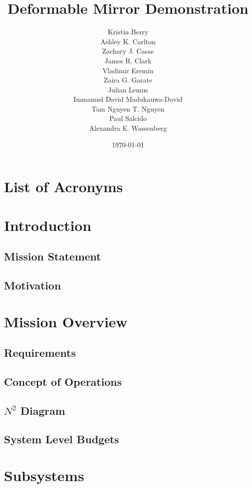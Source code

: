 \documentclass[12pt]{article}
\title{Deformable Mirror Demonstration}
\author{Kristin Berry\\
Ashley K. Carlton\\
Zachary J. Casas\\
James R. Clark\\
Vladimir Eremin\\ 
Zaira G. Garate\\ 
Julian Lemus\\
Immanuel David Madukauwa-David\\
Tam Nguyen T. Nguyen\\
Paul Salcido\\
Alexandra E. Wassenberg 
}
\date{\today}
\begin{document}
\maketitle
\newpage

\tableofcontents
\listoffigures
\listoftables


\section*{List of Acronyms}
\begin{acronym}


\end{acronym}
\newpage

\section{Introduction}
		\subsection{Mission Statement}
		\subsection{Motivation}
\section{Mission Overview}
		\subsection{Requirements}
		\subsection{Concept of Operations}
		\subsection{$N^2$ Diagram}
		\subsection{System Level Budgets}
\section{Subsystems}
\end{document}
